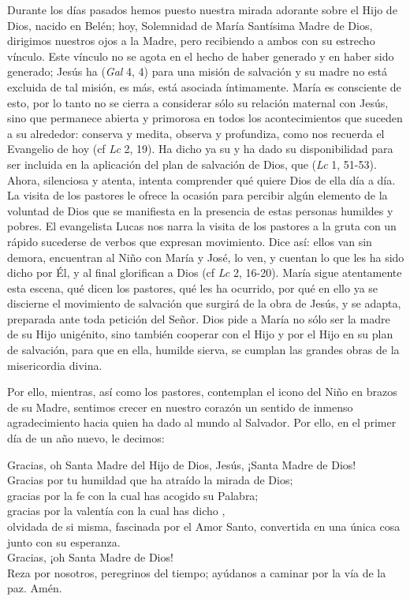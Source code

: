 \begin{body}
\begin{body}
Durante los días pasados hemos puesto nuestra mirada adorante sobre el Hijo de Dios, nacido en Belén; hoy, Solemnidad de María Santísima Madre de Dios, dirigimos nuestros ojos a la Madre, pero recibiendo a ambos con su estrecho vínculo. Este vínculo no se agota en el hecho de haber generado y en haber sido generado; Jesús ha  (\emph{Gal} 4, 4) para una misión de salvación y su madre no está excluida de tal misión, es más, está asociada íntimamente. María es consciente de esto, por lo tanto no se cierra a considerar sólo su relación maternal con Jesús, sino que permanece abierta y primorosa en todos los acontecimientos que suceden a su alrededor: conserva y medita, observa y profundiza, como nos recuerda el Evangelio de hoy (cf \emph{Lc} 2, 19). Ha dicho ya su  y ha dado su disponibilidad para ser incluida en la aplicación del plan de salvación de Dios, que  (\emph{Lc} 1, 51-53). Ahora, silenciosa y atenta, intenta comprender qué quiere Dios de ella día a día. La visita de los pastores le ofrece la ocasión para percibir algún elemento de la voluntad de Dios que se manifiesta en la presencia de estas personas humildes y pobres. El evangelista Lucas nos narra la visita de los pastores a la gruta con un rápido sucederse de verbos que expresan movimiento. Dice así: ellos van sin demora, encuentran al Niño con María y José, lo ven, y cuentan lo que les ha sido dicho por Él, y al final glorifican a Dios (cf \emph{Lc} 2, 16-20). María sigue atentamente esta escena, qué dicen los pastores, qué les ha ocurrido, por qué en ello ya se discierne el movimiento de salvación que surgirá de la obra de Jesús, y se adapta, preparada ante toda petición del Señor. Dios pide a María no sólo ser la madre de su Hijo unigénito, sino también cooperar con el Hijo y por el Hijo en su plan de salvación, para que en ella, humilde sierva, se cumplan las grandes obras de la misericordia divina.

Por ello, mientras, así como los pastores, contemplan el icono del Niño en brazos de su Madre, sentimos crecer en nuestro corazón un sentido de inmenso agradecimiento hacia quien ha dado al mundo al Salvador. Por ello, en el primer día de un año nuevo, le decimos:

Gracias, oh Santa Madre del Hijo de Dios, Jesús, ¡Santa Madre de Dios!\\ Gracias por tu humildad que ha atraído la mirada de Dios;\\ gracias por la fe con la cual has acogido su Palabra;\\ gracias por la valentía con la cual has dicho ,\\ olvidada de si misma, fascinada por el Amor Santo, convertida en una única cosa junto con su esperanza.\\ Gracias, ¡oh Santa Madre de Dios!\\ Reza por nosotros, peregrinos del tiempo; ayúdanos a caminar por la vía de la paz. Amén.


\end{body}
\end{body}
